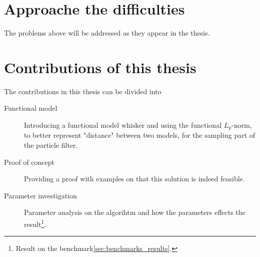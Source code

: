 \section{Approache the difficulties}
The problems above will be addressed as they appear in the thesis.

\section{Contributions of this thesis}
The contributions in this thesis can be divided into
\begin{description}
\item[Functional model] Introducing a functional model
  $\text{whisker}$ and using the functional $L_p$-norm, to better
  represent "distance" between two models, for the sampling part of
  the particle filter.
\item[Proof of concept] Providing a proof with examples on that this
  solution is indeed feasible.
\item[Parameter investigation] Parameter analysis on the algorihtm and
  how the parameters effects the result\footnote{Result on the
    benchmark\ref{sec:benchmarks_results}.}.

\end{description}
